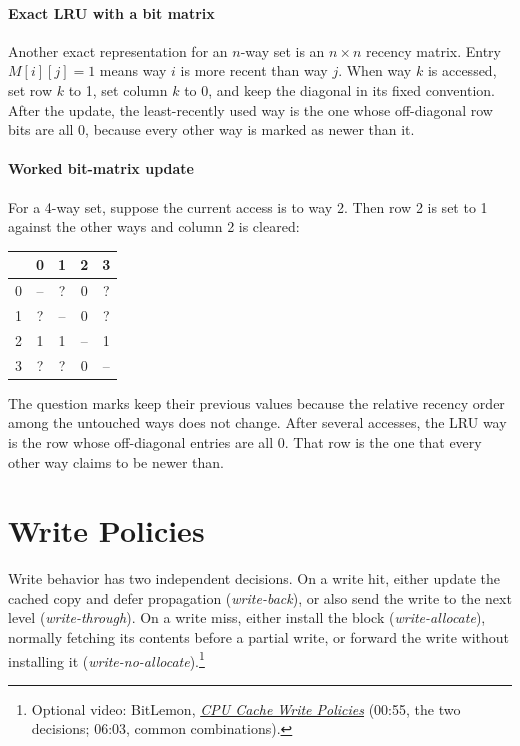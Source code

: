 \paragraph{Exact LRU with a bit matrix}\label{par:auto-019c}
Another exact representation for an $n$-way set is an $n\times n$ recency matrix.
Entry $M[i][j]=1$ means way $i$ is more recent than way $j$.
When way $k$ is accessed, set row $k$ to 1, set column $k$ to 0, and keep the diagonal in its fixed convention.
After the update, the least-recently used way is the one whose off-diagonal row bits are all 0, because every other way is marked as newer than it.

\paragraph{Worked bit-matrix update}\label{par:auto-019e}
For a 4-way set, suppose the current access is to way 2.
Then row 2 is set to 1 against the other ways and column 2 is cleared:
\begin{center}
    \begin{tabular}{|c|cccc|}
        \hline
        & 0  & 1  & 2  & 3  \\
        \hline
        0 & -- & ?
         & 0  & ?  \\
        1 & ?
         & -- & 0  & ?  \\
        2 & 1  & 1  & -- & 1  \\
        3 & ?
         & ?
          & 0  & -- \\
        \hline
    \end{tabular}
\end{center}
The question marks keep their previous values because the relative recency order among the untouched ways does not change.
After several accesses, the LRU way is the row whose off-diagonal entries are all 0.
That row is the one that every other way claims to be newer than.


\section{Write Policies}\label{sec:auto-027}
Write behavior has two independent decisions.
On a write hit, either update the cached copy and defer propagation (\textit{write-back}), or also send the write to the next level (\textit{write-through}).
On a write miss, either install the block (\textit{write-allocate}), normally fetching its contents before a partial write, or forward the write without installing it (\textit{write-no-allocate}).\footnote{Optional video: BitLemon, \href{https://youtu.be/wfVy85Dqiyc?t=55}{\emph{CPU Cache Write Policies}} (00:55, the two decisions; 06:03, common combinations).}

